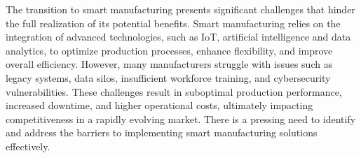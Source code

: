 The transition to smart manufacturing presents significant challenges that hinder the full realization of its potential
benefits. Smart manufacturing relies on the integration of advanced technologies, such as IoT, artificial intelligence
and data analytics, to optimize production processes, enhance flexibility, and improve overall efficiency. However,
many manufacturers struggle with issues such as legacy systems, data silos, insufficient workforce training, and
cybersecurity vulnerabilities.
These challenges result in suboptimal production performance, increased downtime, and higher operational costs,
ultimately impacting competitiveness in a rapidly evolving market. There is a pressing need to identify and address the
barriers to implementing smart manufacturing solutions effectively.